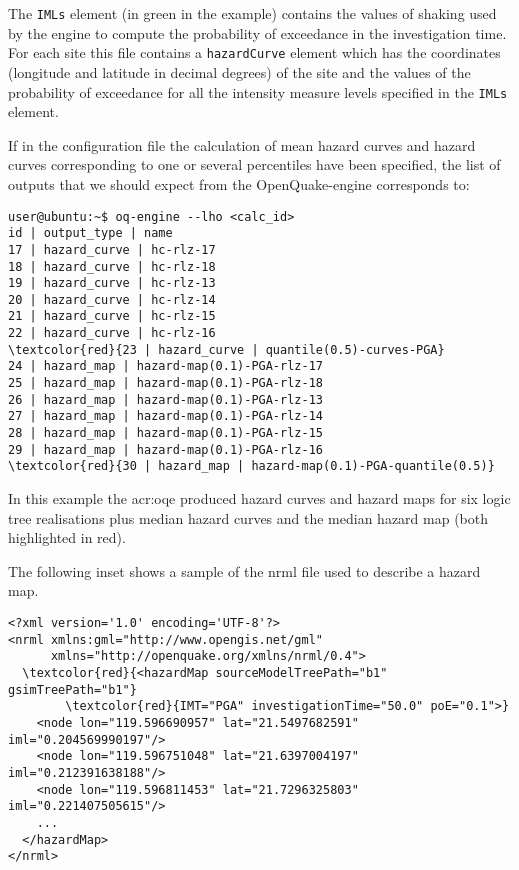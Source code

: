 The \texttt{IMLs} element (in green in the example) contains the 
values of shaking used by the engine to compute the probability of 
exceedance in the investigation time.
For each site this file contains a \texttt{hazardCurve} element which 
has the coordinates (longitude and latitude in decimal degrees) 
of the site and the values of the probability of exceedance for all the 
intensity measure levels specified in the \texttt{IMLs} element.

If in the configuration file the calculation of mean hazard curves 
and hazard curves corresponding to one or several percentiles have 
been specified, the list of outputs that we should expect from the 
OpenQuake-engine corresponds to:
\begin{Verbatim}[frame=single, commandchars=\\\{\}, fontsize=\small]
user@ubuntu:~$ oq-engine --lho <calc_id> 
id | output_type | name
17 | hazard_curve | hc-rlz-17
18 | hazard_curve | hc-rlz-18
19 | hazard_curve | hc-rlz-13
20 | hazard_curve | hc-rlz-14
21 | hazard_curve | hc-rlz-15
22 | hazard_curve | hc-rlz-16
\textcolor{red}{23 | hazard_curve | quantile(0.5)-curves-PGA}
24 | hazard_map | hazard-map(0.1)-PGA-rlz-17
25 | hazard_map | hazard-map(0.1)-PGA-rlz-18
26 | hazard_map | hazard-map(0.1)-PGA-rlz-13
27 | hazard_map | hazard-map(0.1)-PGA-rlz-14
28 | hazard_map | hazard-map(0.1)-PGA-rlz-15
29 | hazard_map | hazard-map(0.1)-PGA-rlz-16
\textcolor{red}{30 | hazard_map | hazard-map(0.1)-PGA-quantile(0.5)}
\end{Verbatim}
In this example the \gls{acr:oqe} produced hazard curves and hazard maps for 
six logic tree realisations plus median hazard curves 
and the median hazard map (both highlighted in red).

The following inset shows a sample of the nrml file used 
to describe a hazard map.
\begin{Verbatim}[frame=single, commandchars=\\\{\}, fontsize=\small]
<?xml version='1.0' encoding='UTF-8'?>
<nrml xmlns:gml="http://www.opengis.net/gml" 
      xmlns="http://openquake.org/xmlns/nrml/0.4">
  \textcolor{red}{<hazardMap sourceModelTreePath="b1" gsimTreePath="b1"}
        \textcolor{red}{IMT="PGA" investigationTime="50.0" poE="0.1">}
    <node lon="119.596690957" lat="21.5497682591" iml="0.204569990197"/>
    <node lon="119.596751048" lat="21.6397004197" iml="0.212391638188"/>
    <node lon="119.596811453" lat="21.7296325803" iml="0.221407505615"/>
    ...
  </hazardMap>
</nrml>
\end{Verbatim}
